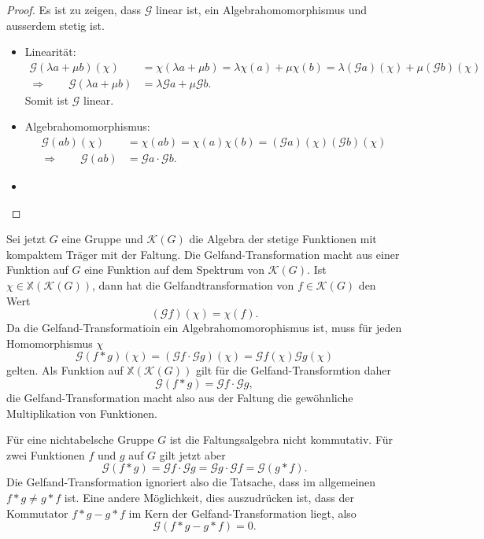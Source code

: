 \begin{proof}
Es ist zu zeigen, dass $\mathscr{G}$ linear ist, ein Algebrahomomorphismus
und ausserdem stetig ist.
\begin{itemize}
\item
Linearität:
\begin{align*}
\mathscr{G}(\lambda a+\mu b) (\chi)
&=
\chi( \lambda a + \mu b)
=
\lambda\chi(a) + \mu\chi(b)
=
\lambda(\mathscr{G}a)(\chi)
+
\mu(\mathscr{G}b)(\chi)
\\
\Rightarrow\qquad
\mathscr{G}(\lambda a+ \mu b)
&=
\lambda\mathscr{G}a + \mu\mathscr{G}b.
\end{align*}
Somit ist $\mathscr{G}$ linear.
\item
Algebrahomomorphismus:
\begin{align*}
\mathscr{G}(ab)(\chi)
&=
\chi(ab)
=
\chi(a)\chi(b)
=
(\mathscr{G}a)(\chi)
(\mathscr{G}b)(\chi)
\\
\Rightarrow\qquad
\mathscr{G}(ab)
&=
\mathscr{G}a\cdot \mathscr{G}b.
\end{align*}
\item
\end{itemize}
\end{proof}

Sei jetzt $G$ eine Gruppe und $\mathscr{K}(G)$ die Algebra der
stetige Funktionen mit kompaktem Träger mit der Faltung.
Die Gelfand-Transformation macht aus einer Funktion auf $G$ 
eine Funktion auf dem Spektrum von $\mathscr{K}(G)$.
Ist $\chi\in\mathbb{X}(\mathscr{K}(G))$, dann hat die Gelfandtransformation
von $f\in\mathscr{K}(G)$ den Wert
\[
(\mathscr{G}f)(\chi) = \chi(f).
\]
Da die Gelfand-Transformatioin ein Algebrahomomorophismus ist,
muss  für jeden Homomorphismus $\chi$
\[
\mathscr{G}(f*g)(\chi)
=
(\mathscr{G}f\cdot \mathscr{G}g) (\chi)
=
\mathscr{G}f(\chi)
\mathscr{G}g(\chi)
\]
gelten.
Als Funktion auf $\mathbb{X}(\mathscr{K}(G))$ gilt für die
Gelfand-Transformtion daher
\[
\mathscr{G}(f*g)
=
\mathscr{G}f
\cdot
\mathscr{G}g,
\]
die Gelfand-Transformation macht also aus der Faltung die
gewöhnliche Multiplikation von Funktionen.

Für eine nichtabelsche Gruppe $G$ ist die Faltungsalgebra nicht
kommutativ.
Für zwei Funktionen $f$ und $g$ auf $G$ gilt jetzt aber
\[
\mathscr{G}(f*g)
=
\mathscr{G}f\cdot\mathscr{G}g
=
\mathscr{G}g\cdot\mathscr{G}f
=
\mathscr{G}(g*f).
\]
Die Gelfand-Transformation ignoriert also die Tatsache, dass im allgemeinen
$f * g\ne g*f$ ist.
Eine andere Möglichkeit, dies auszudrücken ist, dass der Kommutator
$f*g-g*f$ im Kern der Gelfand-Transformation liegt, also
\[
\mathscr{G}(f*g-g*f)=0.
\]

